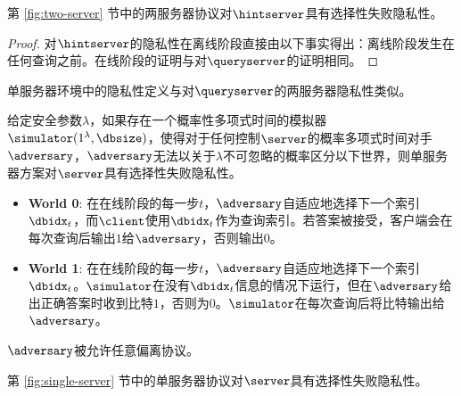 \begin{theorem}
    第 \ref{fig:two-server} 节中的两服务器协议对$\hintserver$具有选择性失败隐私性。
\end{theorem}
    
\begin{proof}
    对$\hintserver$的隐私性在离线阶段直接由以下事实得出：离线阶段发生在任何查询之前。在线阶段的证明与对$\queryserver$的证明相同。
\end{proof}
    
单服务器环境中的隐私性定义与对$\queryserver$的两服务器隐私性类似。
    
\begin{definition}
    给定安全参数$\lambda$，如果存在一个概率性多项式时间的模拟器$\simulator(1^\lambda, \dbsize)$，使得对于任何控制$\server$的概率多项式时间对手$\adversary$，$\adversary$无法以关于$\lambda$不可忽略的概率区分以下世界，则单服务器方案对$\server$具有选择性失败隐私性。
    
    \begin{itemize}
        \item \textbf{World 0}: 在在线阶段的每一步$t$，$\adversary$自适应地选择下一个索引$\dbidx_t$，而$\client$使用$\dbidx_t$作为查询索引。若答案被接受，客户端会在每次查询后输出$1$给$\adversary$，否则输出$0$。
        \item \textbf{World 1}: 在在线阶段的每一步$t$，$\adversary$自适应地选择下一个索引$\dbidx_t$。$\simulator$在没有$\dbidx_t$信息的情况下运行，但在$\adversary$给出正确答案时收到比特$1$，否则为$0$。$\simulator$在每次查询后将比特输出给$\adversary$。
    \end{itemize}$\adversary$被允许任意偏离协议。
\end{definition}
    
\begin{theorem}
    第 \ref{fig:single-server} 节中的单服务器协议对$\server$具有选择性失败隐私性。
\end{theorem}
    
